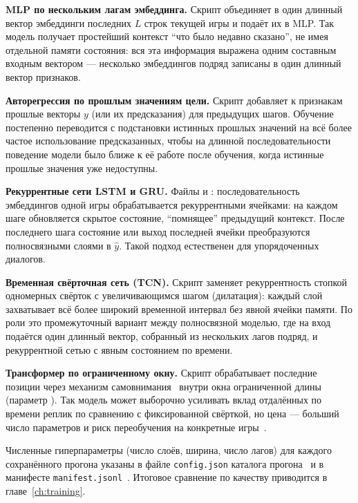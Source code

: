 \textbf{MLP по нескольким лагам эмбеддинга.} Скрипт  объединяет в один длинный вектор эмбеддинги последних $L$ строк текущей игры и подаёт их в MLP. Так модель получает простейший контекст ``что было недавно сказано'', не имея отдельной памяти состояния: вся эта информация выражена одним составным входным вектором --- несколько эмбеддингов подряд записаны в один длинный вектор признаков.

\textbf{Авторегрессия по прошлым значениям цели.} Скрипт  добавляет к признакам прошлые векторы $y$ (или их предсказания) для предыдущих шагов. Обучение постепенно переводится с подстановки истинных прошлых значений на всё более частое использование предсказанных, чтобы на длинной последовательности поведение модели было ближе к её работе после обучения, когда истинные прошлые значения уже недоступны.

\textbf{Рекуррентные сети LSTM и GRU.} Файлы  и : последовательность эмбеддингов одной игры обрабатывается рекуррентными ячейками: на каждом шаге обновляется скрытое состояние, ``помнящее'' предыдущий контекст. После последнего шага состояние или выход последней ячейки преобразуются полносвязными слоями в $\hat y$. Такой подход естественен для упорядоченных диалогов.

\textbf{Временная свёрточная сеть (TCN).} Скрипт  заменяет рекуррентность стопкой одномерных свёрток с увеличивающимся шагом (дилатация): каждый слой захватывает всё более широкий временной интервал без явной ячейки памяти. По роли это промежуточный вариант между полносвязной моделью, где на вход подаётся один длинный вектор, собранный из нескольких лагов подряд, и рекуррентной сетью с явным состоянием по времени.

\textbf{Трансформер по ограниченному окну.} Скрипт  обрабатывает последние позиции через механизм самовнимания~\cite{vaswani2017} внутри окна ограниченной длины (параметр ). Так модель может выборочно усиливать вклад отдалённых по времени реплик по сравнению с фиксированной свёрткой, но цена --- больший число параметров и риск переобучения на конкретные игры~\cite{nikolenko2018}.

Численные гиперпараметры (число слоёв, ширина, число лагов) для каждого сохранённого прогона указаны в файле \texttt{config.json} каталога прогона~ и в манифесте \texttt{manifest.jsonl}~. Итоговое сравнение по качеству приводится в главе~\ref{ch:training}.
